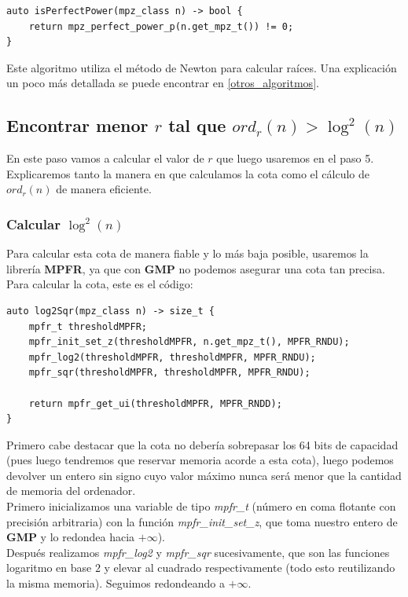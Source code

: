 \begin{lstlisting}
auto isPerfectPower(mpz_class n) -> bool {
	return mpz_perfect_power_p(n.get_mpz_t()) != 0;
}
\end{lstlisting}

Este algoritmo utiliza el método de Newton para calcular raíces. Una explicación un poco más detallada se puede encontrar en \autoref{otros_algoritmos}.

\subsection{Encontrar menor $r$ tal que $ord_r(n) > \log^2(n)$}

En este paso vamos a calcular el valor de $r$ que luego usaremos en el paso 5. Explicaremos tanto la manera en que calculamos la cota como el cálculo de $ord_r(n)$ de manera eficiente.

\subsubsection{Calcular $\log^2(n)$}

Para calcular esta cota de manera fiable y lo más baja posible, usaremos la librería \textbf{MPFR}, ya que con \textbf{GMP} no podemos asegurar una cota tan precisa. Para calcular la cota, este es el código:\\

\begin{lstlisting}
auto log2Sqr(mpz_class n) -> size_t {
	mpfr_t thresholdMPFR;
	mpfr_init_set_z(thresholdMPFR, n.get_mpz_t(), MPFR_RNDU);
	mpfr_log2(thresholdMPFR, thresholdMPFR, MPFR_RNDU);
	mpfr_sqr(thresholdMPFR, thresholdMPFR, MPFR_RNDU);
	
	return mpfr_get_ui(thresholdMPFR, MPFR_RNDD);
}
\end{lstlisting}

Primero cabe destacar que la cota no debería sobrepasar los 64 bits de capacidad (pues luego tendremos que reservar memoria acorde a esta cota), luego podemos devolver un entero sin signo cuyo valor máximo nunca será menor que la cantidad de memoria del ordenador.\\

Primero inicializamos una variable de tipo \textit{mpfr\_t} (número en coma flotante con precisión arbitraria) con la función \textit{mpfr\_init\_set\_z}, que toma nuestro entero de \textbf{GMP} y lo redondea hacia $+\infty$).\\

Después realizamos \textit{mpfr\_log2} y \textit{mpfr\_sqr} sucesivamente, que son las funciones logaritmo en base $2$ y elevar al cuadrado respectivamente (todo esto reutilizando la misma memoria). Seguimos redondeando a $+\infty$.\\

